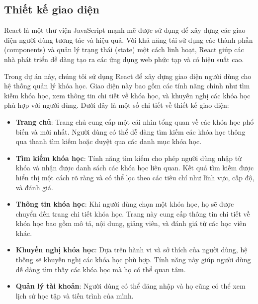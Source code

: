 \subsection{Thiết kế giao diện}

React là một thư viện JavaScript mạnh mẽ được sử dụng để xây dựng các giao diện người dùng tương tác và hiệu quả. Với khả năng tái sử dụng các thành phần (components) và quản lý trạng thái (state) một cách linh hoạt, React giúp các nhà phát triển dễ dàng tạo ra các ứng dụng web phức tạp và có hiệu suất cao.

Trong dự án này, chúng tôi sử dụng React để xây dựng giao diện người dùng cho hệ thống quản lý khóa học. Giao diện này bao gồm các tính năng chính như tìm kiếm khóa học, xem thông tin chi tiết về khóa học, và khuyến nghị các khóa học phù hợp với người dùng. Dưới đây là một số chi tiết về thiết kế giao diện:

\begin{itemize}
    \item \textbf{Trang chủ}: Trang chủ cung cấp một cái nhìn tổng quan về các khóa học phổ biến và mới nhất. Người dùng có thể dễ dàng tìm kiếm các khóa học thông qua thanh tìm kiếm hoặc duyệt qua các danh mục khóa học.
    \item \textbf{Tìm kiếm khóa học}: Tính năng tìm kiếm cho phép người dùng nhập từ khóa và nhận được danh sách các khóa học liên quan. Kết quả tìm kiếm được hiển thị một cách rõ ràng và có thể lọc theo các tiêu chí như lĩnh vực, cấp độ, và đánh giá.
    \item \textbf{Thông tin khóa học}: Khi người dùng chọn một khóa học, họ sẽ được chuyển đến trang chi tiết khóa học. Trang này cung cấp thông tin chi tiết về khóa học bao gồm mô tả, nội dung, giảng viên, và đánh giá từ các học viên khác.
    \item \textbf{Khuyến nghị khóa học}: Dựa trên hành vi và sở thích của người dùng, hệ thống sẽ khuyến nghị các khóa học phù hợp. Tính năng này giúp người dùng dễ dàng tìm thấy các khóa học mà họ có thể quan tâm.
    \item \textbf{Quản lý tài khoản}: Người dùng có thể đăng nhập và họ cũng có thể xem lịch sử học tập và tiến trình của mình.
\end{itemize}
